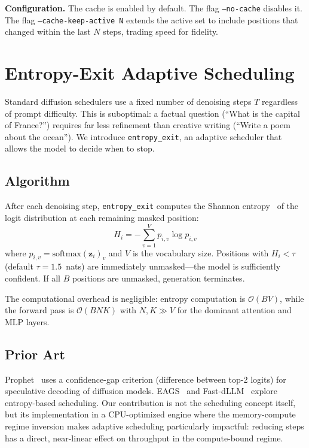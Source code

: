 \documentclass[11pt]{article}
\begin{document}
\textbf{Configuration.} The cache is enabled by default. The flag \texttt{--no-cache}
disables it. The flag \texttt{--cache-keep-active N} extends the active set to include
positions that changed within the last $N$ steps, trading speed for fidelity.


\section{Entropy-Exit Adaptive Scheduling}
\label{sec:entropy}

Standard diffusion schedulers use a fixed number of denoising steps $T$ regardless of
prompt difficulty. This is suboptimal: a factual question (``What is the capital of
France?'') requires far less refinement than creative writing (``Write a poem about the
ocean''). We introduce \texttt{entropy\_exit}, an adaptive scheduler that allows the
model to decide when to stop.

\subsection{Algorithm}

After each denoising step, \texttt{entropy\_exit} computes the Shannon
entropy~\cite{shannon1948} of the logit distribution at each remaining masked position:
\begin{equation}
H_i = -\sum_{v=1}^{V} p_{i,v} \log p_{i,v}
\end{equation}
where $p_{i,v} = \text{softmax}(\mathbf{z}_i)_v$ and $V$ is the vocabulary size.
Positions with $H_i < \tau$ (default $\tau = 1.5$~nats) are immediately
unmasked---the model is sufficiently confident. If all $B$ positions are unmasked,
generation terminates.

The computational overhead is negligible: entropy computation is $\mathcal{O}(BV)$,
while the forward pass is $\mathcal{O}(BNK)$ with $N, K \gg V$ for the dominant
attention and MLP layers.

\subsection{Prior Art}

Prophet~\cite{li2025} uses a confidence-gap criterion (difference between top-2 logits)
for speculative decoding of diffusion models. EAGS~\cite{koh2024} and
Fast-dLLM~\cite{wu2025} explore entropy-based scheduling. Our contribution is not the
scheduling concept itself, but its implementation in a CPU-optimized engine where the
memory-compute regime inversion makes adaptive scheduling particularly impactful:
reducing steps has a direct, near-linear effect on throughput in the compute-bound regime.
\end{document}
